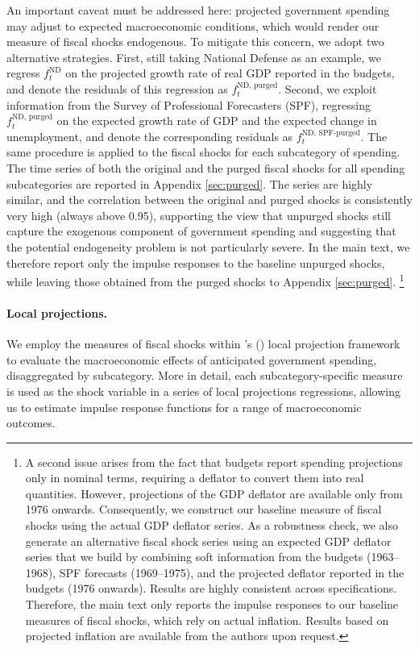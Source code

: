 \documentclass[12pt]{article}%
\def\citetpos#1{\citeauthor{#1}'s (\citeyear{#1})}
\theoremstyle{remark}
\begin{document}
An important caveat must be addressed here: projected government spending may adjust to expected macroeconomic conditions, which would render our measure of fiscal shocks endogenous. To mitigate this concern, we adopt two alternative strategies. First, still taking National Defense as an example, we regress $f^{\text{ND}}_t$ on the projected growth rate of real GDP reported in the budgets, and denote the residuals of this regression as $f^{\text{ND, purged}}_t$. Second, we exploit information from the Survey of Professional Forecasters (SPF), regressing $f^{\text{ND, purged}}_t$ on the expected growth rate of GDP and the expected change in unemployment, and denote the corresponding residuals as $f^{\text{ND, SPF-purged}}_t$. The same procedure is applied to the fiscal shocks for each subcategory of spending. The time series of both the original and the purged fiscal shocks for all spending subcategories are reported in Appendix \ref{sec:purged}. The series are highly similar, and the correlation between the original and purged shocks is consistently very high (always above 0.95), supporting the view that unpurged shocks still capture the exogenous component of government spending and suggesting that the potential endogeneity problem is not particularly severe. In the main text, we therefore report only the impulse responses to the baseline unpurged shocks, while leaving those obtained from the purged shocks to Appendix \ref{sec:purged}.%
\footnote{A second issue arises from the fact that budgets report spending projections only in nominal terms, requiring a deflator to convert them into real quantities. However, projections of the GDP deflator are available only from 1976 onwards. Consequently, we construct our baseline measure of fiscal shocks using the actual GDP deflator series. As a robustness check, we also generate an alternative fiscal shock series using an expected GDP deflator series that we build by combining soft information from the budgets (1963–1968), SPF forecasts (1969–1975), and the projected deflator reported in the budgets (1976 onwards). %
Results are highly consistent across specifications. Therefore, the main text only reports the impulse responses to our baseline measures of fiscal shocks, which rely on actual inflation. Results based on projected inflation are available from the authors upon request.}

\paragraph{Local projections.} We employ the measures of fiscal shocks within  \citetpos{Jorda} local projection framework to evaluate the macroeconomic effects of anticipated government spending, disaggregated by subcategory.  More in detail, each subcategory-specific measure is used as the shock variable in a series of local projections regressions, allowing us to estimate impulse response functions for a range of macroeconomic outcomes. 
\end{document}
